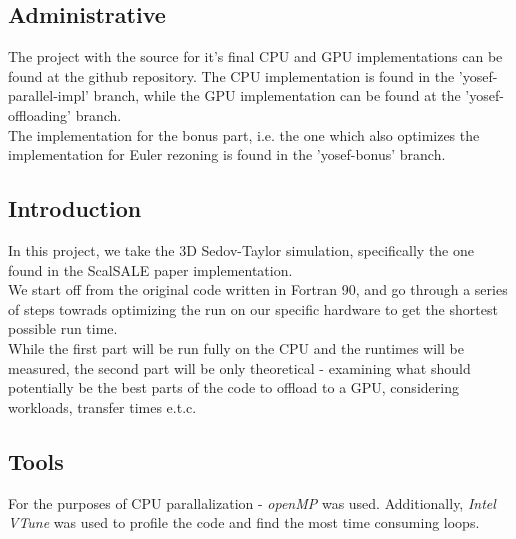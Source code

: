 \subsection*{Administrative}
The project with the source for it's final CPU and GPU implementations can be found at the github \cite{this_repo}
repository. The CPU implementation is found in the 'yosef-parallel-impl' branch,
while the GPU implementation can be found at the 'yosef-offloading' branch.\\
The implementation for the bonus part,
i.e. the one which also optimizes the implementation for Euler rezoning
is found in the 'yosef-bonus' branch.\\

\subsection*{Introduction}
In this project, we take the 3D Sedov-Taylor simulation, specifically the
one found in the ScalSALE\cite{scalsale} paper implementation.\\
We start off from the original code written in Fortran 90, 
and go through a series of steps towrads optimizing the run on our specific
hardware to get the shortest possible run time.\\
While the first part will be run fully on the CPU and the runtimes will be measured,
the second part will be only theoretical - examining what should potentially
be the best parts of the code to offload to a GPU, considering workloads,
transfer times e.t.c.\\

\subsection*{Tools}
For the purposes of CPU parallalization - \emph{openMP} was used.
Additionally, \emph{Intel VTune} was used to profile the code and
find the most time consuming loops.
